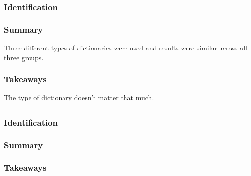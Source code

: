 \documentclass[
	letterpaper, %
]{jdf}
\begin{document}
\subsubsection{Identification}

\subsubsection{Summary}
Three different types of dictionaries were used and results were similar across all three groups.

\subsubsection{Takeaways}
The type of dictionary doesn't matter that much.


\subsection{}
\subsubsection{Identification}

\subsubsection{Summary}


\subsubsection{Takeaways}


\subsection{}
\end{document}
